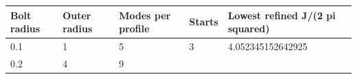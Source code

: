 \documentclass[
  10pt,
]{article}
\begin{document}
\begin{longtable}[]{@{}>{\raggedright\arraybackslash}p{\dimexpr(\linewidth-8\tabcolsep)/5\relax}>{\raggedright\arraybackslash}p{\dimexpr(\linewidth-8\tabcolsep)/5\relax}>{\raggedright\arraybackslash}p{\dimexpr(\linewidth-8\tabcolsep)/5\relax}>{\raggedright\arraybackslash}p{\dimexpr(\linewidth-8\tabcolsep)/5\relax}>{\raggedright\arraybackslash}p{\dimexpr(\linewidth-8\tabcolsep)/5\relax}@{}}
\toprule
\begin{minipage}[b]{0.17\columnwidth}\raggedright
Bolt radius\strut
\end{minipage} & \begin{minipage}[b]{0.17\columnwidth}\raggedright
Outer radius\strut
\end{minipage} & \begin{minipage}[b]{0.17\columnwidth}\raggedright
Modes per profile\strut
\end{minipage} & \begin{minipage}[b]{0.17\columnwidth}\raggedright
Starts\strut
\end{minipage} & \begin{minipage}[b]{0.17\columnwidth}\raggedright
Lowest refined J/(2 pi squared)\strut
\end{minipage}\tabularnewline
\midrule
\endhead
\begin{minipage}[t]{0.17\columnwidth}\raggedright
0.1\strut
\end{minipage} & \begin{minipage}[t]{0.17\columnwidth}\raggedright
1\strut
\end{minipage} & \begin{minipage}[t]{0.17\columnwidth}\raggedright
5\strut
\end{minipage} & \begin{minipage}[t]{0.17\columnwidth}\raggedright
3\strut
\end{minipage} & \begin{minipage}[t]{0.17\columnwidth}\raggedright
4.052345152642925\strut
\end{minipage}\tabularnewline
\begin{minipage}[t]{0.17\columnwidth}\raggedright
0.2\strut
\end{minipage} & \begin{minipage}[t]{0.17\columnwidth}\raggedright
4\strut
\end{minipage} & \begin{minipage}[t]{0.17\columnwidth}\raggedright
9\strut
\end{minipage} & \begin{minipage}[t]{0.17\columnwidth}\raggedright

\end{minipage}
\end{longtable}
\end{document}
